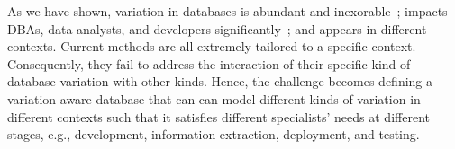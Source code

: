 As we have shown, 
variation in databases is abundant and inexorable~\cite{dbDecay16Stonebraker};
impacts DBAs, data analysts, and developers significantly~\cite{dbSPLevolve}; 
and appears in different contexts. Current methods
are all extremely tailored to a specific context. Consequently, they fail to address
the interaction of their specific kind of database variation with other kinds.
Hence, the challenge becomes defining a variation-aware database that can 
can model different kinds of variation
in different contexts such that it satisfies different specialists' needs at different stages,
e.g., development, information extraction, deployment, and testing. 